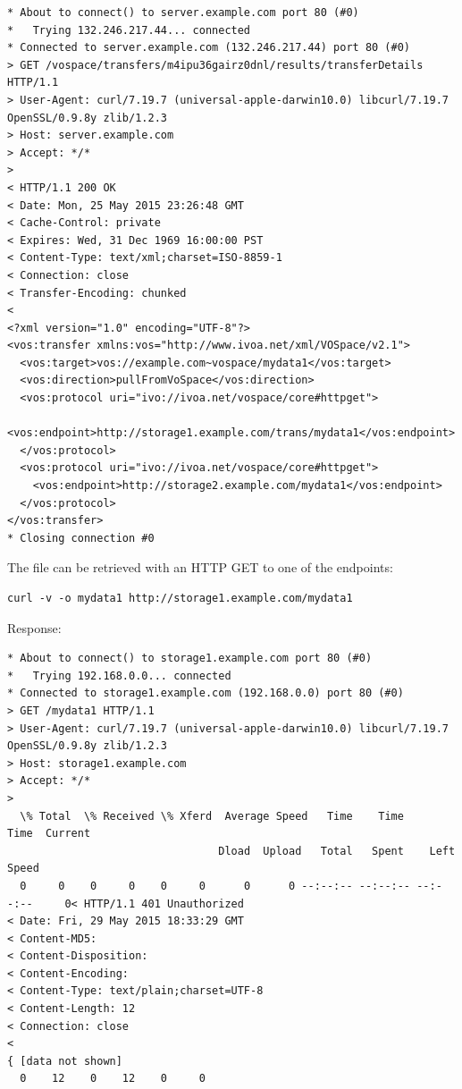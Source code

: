 \documentclass[11pt,a4paper]{ivoa}
\begin{document}
\begin{lstlisting}
* About to connect() to server.example.com port 80 (#0)
*   Trying 132.246.217.44... connected
* Connected to server.example.com (132.246.217.44) port 80 (#0)
> GET /vospace/transfers/m4ipu36gairz0dnl/results/transferDetails HTTP/1.1
> User-Agent: curl/7.19.7 (universal-apple-darwin10.0) libcurl/7.19.7 OpenSSL/0.9.8y zlib/1.2.3
> Host: server.example.com
> Accept: */*
>
< HTTP/1.1 200 OK
< Date: Mon, 25 May 2015 23:26:48 GMT
< Cache-Control: private
< Expires: Wed, 31 Dec 1969 16:00:00 PST
< Content-Type: text/xml;charset=ISO-8859-1
< Connection: close
< Transfer-Encoding: chunked
<
<?xml version="1.0" encoding="UTF-8"?>
<vos:transfer xmlns:vos="http://www.ivoa.net/xml/VOSpace/v2.1">
  <vos:target>vos://example.com~vospace/mydata1</vos:target>
  <vos:direction>pullFromVoSpace</vos:direction>
  <vos:protocol uri="ivo://ivoa.net/vospace/core#httpget">
    <vos:endpoint>http://storage1.example.com/trans/mydata1</vos:endpoint>
  </vos:protocol>
  <vos:protocol uri="ivo://ivoa.net/vospace/core#httpget">
    <vos:endpoint>http://storage2.example.com/mydata1</vos:endpoint>
  </vos:protocol>
</vos:transfer>
* Closing connection #0
\end{lstlisting}
The file can be retrieved with an HTTP GET to one of the endpoints:
\begin{lstlisting}
curl -v -o mydata1 http://storage1.example.com/mydata1
\end{lstlisting}
Response:
\begin{lstlisting}
* About to connect() to storage1.example.com port 80 (#0)
*   Trying 192.168.0.0... connected
* Connected to storage1.example.com (192.168.0.0) port 80 (#0)
> GET /mydata1 HTTP/1.1
> User-Agent: curl/7.19.7 (universal-apple-darwin10.0) libcurl/7.19.7 OpenSSL/0.9.8y zlib/1.2.3
> Host: storage1.example.com
> Accept: */*
>
  \% Total  \% Received \% Xferd  Average Speed   Time    Time     Time  Current
                                 Dload  Upload   Total   Spent    Left  Speed
  0     0    0     0    0     0      0      0 --:--:-- --:--:-- --:--:--     0< HTTP/1.1 401 Unauthorized
< Date: Fri, 29 May 2015 18:33:29 GMT
< Content-MD5:
< Content-Disposition:
< Content-Encoding:
< Content-Type: text/plain;charset=UTF-8
< Content-Length: 12
< Connection: close
<
{ [data not shown]
  0    12    0    12    0     0   
\end{lstlisting}
\end{document}

